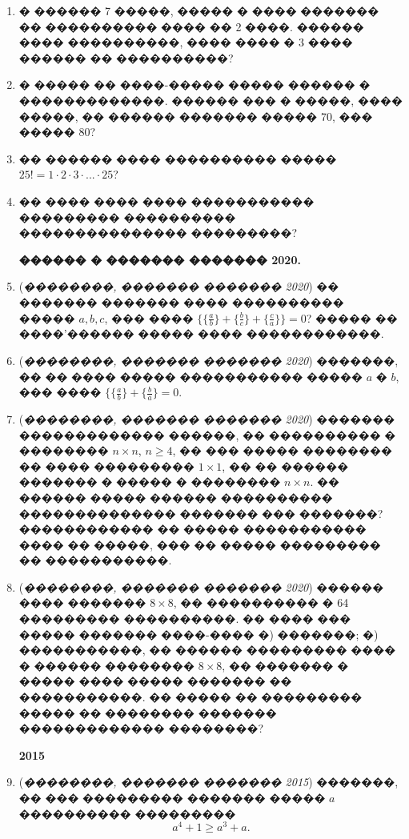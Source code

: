 \documentclass[a4paper,12pt]{article}
\begin{document}
\begin{enumerate}
\item � ������ 7 �����, ����� � ���� ������� �� ���������� ���� �� 2 ����. ������ ���� ����������, ���� ���� � 3 ���� ������ �� ����������?

\item � ����� �� ����-����� ����� ������ � �������������. ������ ��� � �����, ���� �����, �� ������ ������� ����� 70, ��� ����� 80?

\item �� ������ ���� ���������� ����� $25!=1\cdot 2\cdot 3\cdot ... \cdot 25$?

\item �� ���� ���� ���� ����������� ��������� ���������� ��������������� ���������?

\textbf{������ � ������� ������� 2020.}

\item (\textit{��������, ������� ������� 2020}) �� ������� ������� ���� ���������� ����� $a,b,c$, ��� ���� $\{\{\frac{a}{b}\}+\{\frac{b}{c}\}+\{\frac{c}{a}\}\}=0$? ����� �� ����'������ ����� ���� ������������.

\item (\textit{��������, ������� ������� 2020}) �������, �� �� ���� ����� ����������� ����� $a$ � $b$, ��� ���� $\{\{\frac{a}{b}\}+\{\frac{b}{a}\}=0.$



\item (\textit{��������, ������� ������� 2020}) ������� ������������� ������, �� ���������� � �������� $n\times n$, $n\geq 4$, �� ��� ����� �������� �� ���� ��������� $1\times 1$, �� �� ������ ������� � ����� � �������� $n\times n$. �� ������ ����� ������ ���������� �������������� ������� ��� �������? ������������ �� ����� ����������� ���� �� �����, ��� �� ����� ��������� �� �����������.

\item (\textit{��������, ������� ������� 2020}) ������ ���� ������� $8\times 8$, �� ���������� � 64 ��������� ����������. �� ���� ��� ����� ������� ����-���� �) �������; �) �����������, �� ������ ��������� ���� � ������ �������� $8\times 8$, �� ������� � ����� ���� ����� ������� �� �����������. �� ����� �� ��������� ����� �� �������� ������� ������������� ��������?


\textbf{2015}

\item (\textit{��������, ������� ������� 2015}) �������, �� ��� ��������� ������� ����� $a$ ���������� ��������� $$a^{4}+1\geq a^{3}+a.$$


\end{enumerate}
\end{document}
